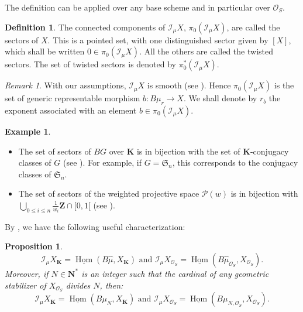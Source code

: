 \documentclass{proc-l}
\newcommand{\Z}{\mathbf{Z}}
\newcommand{\K}{\mathbf{K}}
\newcommand{\N}{\mathbf{N}}
\newcommand{\Sym}{\mathfrak{S}}
\DeclareMathOperator{\Hom}{Hom}
\newcommand{\stackP}{\mathcal{P}}
\newcommand{\sheafI}{\mathcal{I}}
\newcommand{\sheafO}{\mathcal{O}}
\newcommand{\sector}{\pi_0(\sheafI_{\mu} X)}
\newcommand{\twistsector}{\pi_0^*(\sheafI_{\mu} X)}
\newtheorem{prop}[theorem]{Proposition}
\theoremstyle{definition}
\newtheorem{definition}[theorem]{Definition}
\newtheorem{example}[theorem]{Example}
\theoremstyle{remark}
\newtheorem{remark}[theorem]{Remark}
\numberwithin{equation}{section}
\begin{document}
The definition can be applied over any base scheme and in particular over $\sheafO_S$.

\begin{definition}
    The connected components of $\sheafI_{\mu} X$, $\sector$, are called the sectors of $X$. This is a pointed set, with one distinguished sector given by $[X]$, which shall be written $0 \in \sector$. All the others are called the twisted sectors. The set of twisted sectors is denoted by $ \twistsector$.
\end{definition}

\begin{remark}
    With our assumptions, $\sheafI_{\mu} X$ is smooth (see \cite[lemma 2.7]{darda2024batyrevmanin}). Hence $\sector$ is the set of generic representable morphism $b : B \mu_r \rightarrow X$. We shall denote by $r_b$ the exponent associated with an element $b \in \sector$.
\end{remark}

\begin{example}
    \begin{itemize}
        \item The set of sectors of $B G$ over $\K$ is in bijection with the set of $\K$-conjugacy classes of $G$ (see \cite[example 2.15]{darda2024batyrevmanin}). For example, if $G = \Sym_n$, this corresponds to the conjugacy classes of $\Sym_n$. 
        \item The set of sectors of the weighted projective space $\stackP(w)$ is in  bijection with $\bigcup\limits_{0 \leqslant i \leqslant n} \frac{1}{w_i} \Z \cap [0,1[ $ (see \cite[proposition 3.9]{mann2006orbifoldquantumcohomologyweighted}). 
    \end{itemize}
\end{example}

By \cite[proposition 2.11]{darda2024batyrevmanin}, we have the following useful characterization:

\begin{prop}
    $$\sheafI_{\mu} X_{\K} = \underline{\Hom}(B \widehat{\mu},X_{\K}) \text{ and } \sheafI_{\mu} X_{\sheafO_S} = \underline{\Hom}(B \widehat{\mu}_{\sheafO_S},X_{\sheafO_S}) .$$Moreover, if $N \in \N^*$ is an integer such that the cardinal of any geometric stabilizer of $X_{\sheafO_S}$ divides $N$, then:
    $$\sheafI_{\mu} X_{\K} = \underline{\Hom}(B \mu_N,X_{\K}) \text{ and } \sheafI_{\mu} X_{\sheafO_S} = \underline{\Hom}(B \mu_{N,\sheafO_S},X_{\sheafO_S}) .$$
\end{prop}
\end{document}
